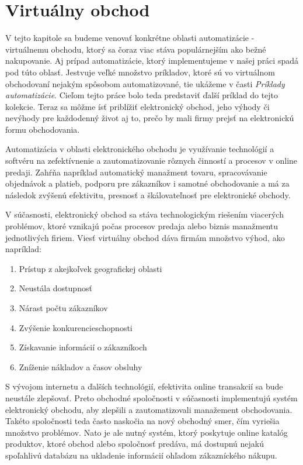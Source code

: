\documentclass[twoside,slovak, a4paper]{article}
\begin{document}
\newpage

\section{Virtuálny obchod}

V tejto kapitole sa budeme venovať konkrétne oblasti automatizácie - virtuálnemu obchodu, ktorý sa čoraz viac stáva populárnejším ako bežné nakupovanie. Aj prípad automatizácie, ktorý implementujeme v našej práci spadá pod túto oblasť. Jestvuje veľké množstvo príkladov, ktoré sú vo virtuálnom obchodovaní nejakým spôsobom automatizované, tie ukážeme v časti \textit{Príklady automatizácie}. Cieľom tejto práce bolo teda predstaviť ďalší príklad do tejto kolekcie. Teraz sa môžme ísť priblížiť elektronický obchod, jeho výhody či nevýhody pre každodenný život aj to, prečo by mali firmy prejsť na elektronickú formu obchodovania.

Automatizácia v oblasti elektronického obchodu je využívanie technológií a softvéru na zefektívnenie a zautomatizovanie rôznych činností a procesov v online predaji. Zahŕňa napríklad automatický manažment tovaru, spracovávanie objednávok a platieb, podporu pre zákazníkov i samotné obchodovanie a má za následok zvýšenú efektivitu, presnosť a škálovateľnosť pre elektronické obchody.\cite{SPC:EA}

V súčasnosti, elektronický obchod sa stáva technologickým riešením viacerých problémov, ktoré vznikajú počas procesov predaja alebo biznis manažmentu jednotlivých firiem.\cite{tupia2021implementation} Viesť virtuálny obchod dáva firmám množstvo výhod, ako napríklad:

\begin{enumerate}
    \item Prístup z akejkoľvek geografickej oblasti
    \item Neustála dostupnosť
    \item Nárast počtu zákazníkov
    \item Zvýšenie konkurencieschopnosti
    \item Získavanie informácií o zákazníkoch
    \item Zníženie nákladov a časov obsluhy
\end{enumerate}

S vývojom internetu a ďalších technológií, efektivita online transakcií sa bude neustále zlepšovať. Preto obchodné spoločnosti v súčasnosti implementujú systém elektronický obchodu, aby zlepšili a zautomatizovali manažement obchodovania. Takéto spoločnosti teda často naskočia na nový obchodný smer, čím vyriešia množstvo problémov. Nato je ale nutný systém, ktorý poskytuje online katalóg produktov, ktoré obchod alebo spoločnosť predáva, má dostupnú nejakú spoľahlivú databázu na ukladenie informácií ohľadom zákazníckého nákupu.\cite{tupia2021implementation}
\end{document}
